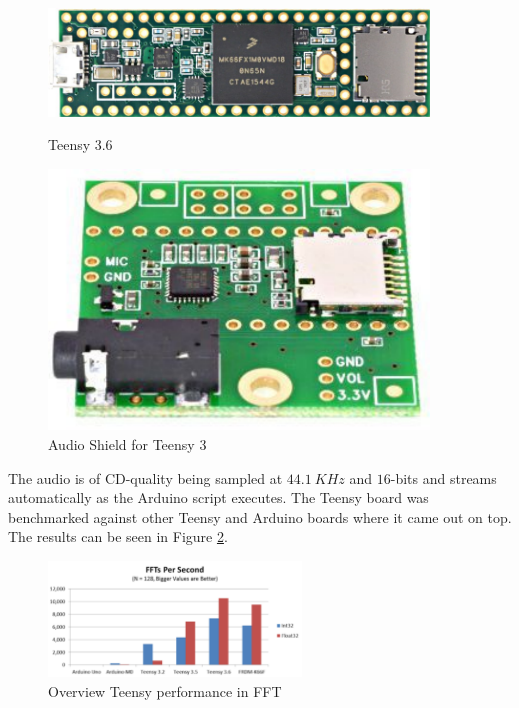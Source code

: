 \begin{figure}[h!]
    \centering
    \begin{minipage}{0.45\textwidth}
        \centering
        \includegraphics[width=0.9\textwidth]{images/teensy36.pdf}
        \caption{Teensy 3.6}\label{fig:teensy36}
    \end{minipage}\hfill
    \begin{minipage}{0.45\textwidth}
        \centering
        \includegraphics[width=0.9\textwidth]{images/teensy3_audio.pdf}
        \caption{Audio Shield for Teensy 3}\label{fig:teensyaudio}
    \end{minipage}
\end{figure}

The audio is of CD-quality being sampled at $44.1\ KHz$ and $16$-bits and streams automatically as the Arduino script executes. The Teensy board was benchmarked against other Teensy and Arduino boards where it came out on top. The results can be seen in Figure \ref{pic:teensyfft}\cite{chip_open_2016}.

\begin{figure}[h!]
    \centering
    \includegraphics[width = 0.6\textwidth]{images/teensyfft.pdf}
    \caption{Overview Teensy performance in FFT}\label{pic:teensyfft}
\end{figure}

